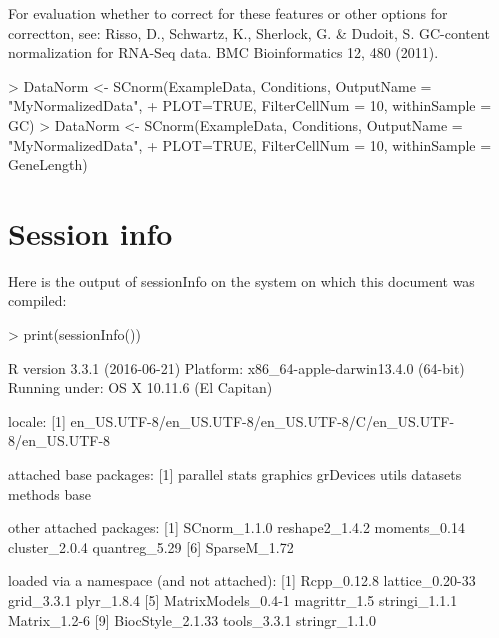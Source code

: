 \documentclass{article}
\begin{document}
For evaluation whether to correct for these features or other options for correctton, see: Risso, D., Schwartz, K., Sherlock, G. \& Dudoit, S. GC-content normalization for RNA-Seq data. BMC Bioinformatics 12, 480 (2011).

\begin{Schunk}
\begin{Sinput}
> DataNorm <- SCnorm(ExampleData, Conditions, OutputName = "MyNormalizedData",
+                      PLOT=TRUE, FilterCellNum = 10, withinSample = GC)
> DataNorm <- SCnorm(ExampleData, Conditions, OutputName = "MyNormalizedData",
+                      PLOT=TRUE, FilterCellNum = 10, withinSample = GeneLength)
\end{Sinput}
\end{Schunk}




\section{Session info}
Here is the output of sessionInfo on the system on which this document was compiled:
\begin{Schunk}
\begin{Sinput}
>   print(sessionInfo())
\end{Sinput}
\begin{Soutput}
R version 3.3.1 (2016-06-21)
Platform: x86_64-apple-darwin13.4.0 (64-bit)
Running under: OS X 10.11.6 (El Capitan)

locale:
[1] en_US.UTF-8/en_US.UTF-8/en_US.UTF-8/C/en_US.UTF-8/en_US.UTF-8

attached base packages:
[1] parallel  stats     graphics  grDevices utils     datasets  methods   base     

other attached packages:
[1] SCnorm_1.1.0   reshape2_1.4.2 moments_0.14   cluster_2.0.4  quantreg_5.29 
[6] SparseM_1.72  

loaded via a namespace (and not attached):
 [1] Rcpp_0.12.8        lattice_0.20-33    grid_3.3.1         plyr_1.8.4        
 [5] MatrixModels_0.4-1 magrittr_1.5       stringi_1.1.1      Matrix_1.2-6      
 [9] BiocStyle_2.1.33   tools_3.3.1        stringr_1.1.0     
\end{Soutput}
\end{Schunk}
  
  \vspace{1cm}
%


%
\end{document}
